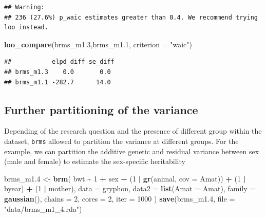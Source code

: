 \documentclass[
  12pt,
]{book}
\newenvironment{Shaded}{\begin{snugshade}}{\end{snugshade}}
\newcommand{\DataTypeTok}[1]{\textcolor[rgb]{0.13,0.29,0.53}{#1}}
\newcommand{\DecValTok}[1]{\textcolor[rgb]{0.00,0.00,0.81}{#1}}
\newcommand{\FloatTok}[1]{\textcolor[rgb]{0.00,0.00,0.81}{#1}}
\newcommand{\KeywordTok}[1]{\textcolor[rgb]{0.13,0.29,0.53}{\textbf{#1}}}
\newcommand{\NormalTok}[1]{#1}
\newcommand{\OperatorTok}[1]{\textcolor[rgb]{0.81,0.36,0.00}{\textbf{#1}}}
\newcommand{\StringTok}[1]{\textcolor[rgb]{0.31,0.60,0.02}{#1}}
\begin{document}
\begin{verbatim}
## Warning: 
## 236 (27.6%) p_waic estimates greater than 0.4. We recommend trying loo instead.
\end{verbatim}

\begin{Shaded}
\begin{Highlighting}[]
\KeywordTok{loo\_compare}\NormalTok{(brms\_m1}\FloatTok{.3}\NormalTok{,brms\_m1}\FloatTok{.1}\NormalTok{, }\DataTypeTok{criterion =} \StringTok{"waic"}\NormalTok{)}
\end{Highlighting}
\end{Shaded}

\begin{verbatim}
##           elpd_diff se_diff
## brms_m1.3    0.0       0.0 
## brms_m1.1 -282.7      14.0
\end{verbatim}

\hypertarget{further-partitioning-of-the-variance}{%
\subsection{Further partitioning of the variance}\label{further-partitioning-of-the-variance}}

Depending of the research question and the presence of different group within the dataset, \texttt{brms} allowed to partition the variance at different groups.
For the example, we can partition the additive genetic and residual variance between sex (male and female) to estimate the sex-specific heritability

\begin{Shaded}
\begin{Highlighting}[]
\NormalTok{brms\_m1}\FloatTok{.4}\NormalTok{ \textless{}{-}}\StringTok{ }\KeywordTok{brm}\NormalTok{(}
\NormalTok{  bwt }\OperatorTok{\textasciitilde{}}\StringTok{ }\DecValTok{1} \OperatorTok{+}\StringTok{ }\NormalTok{sex }\OperatorTok{+}\StringTok{ }\NormalTok{(}\DecValTok{1} \OperatorTok{|}\StringTok{ }\KeywordTok{gr}\NormalTok{(animal, }\DataTypeTok{cov =}\NormalTok{ Amat)) }\OperatorTok{+}\StringTok{ }\NormalTok{(}\DecValTok{1} \OperatorTok{|}\StringTok{ }\NormalTok{byear) }\OperatorTok{+}\StringTok{ }\NormalTok{(}\DecValTok{1} \OperatorTok{|}\StringTok{ }\NormalTok{mother),}
  \DataTypeTok{data =}\NormalTok{ gryphon,}
  \DataTypeTok{data2 =} \KeywordTok{list}\NormalTok{(}\DataTypeTok{Amat =}\NormalTok{ Amat),}
  \DataTypeTok{family =} \KeywordTok{gaussian}\NormalTok{(),}
  \DataTypeTok{chains =} \DecValTok{2}\NormalTok{, }\DataTypeTok{cores =} \DecValTok{2}\NormalTok{, }\DataTypeTok{iter =} \DecValTok{1000}
\NormalTok{)}
\KeywordTok{save}\NormalTok{(brms\_m1}\FloatTok{.4}\NormalTok{, }\DataTypeTok{file =} \StringTok{"data/brms\_m1\_4.rda"}\NormalTok{)}
\end{Highlighting}
\end{Shaded}
\end{document}
